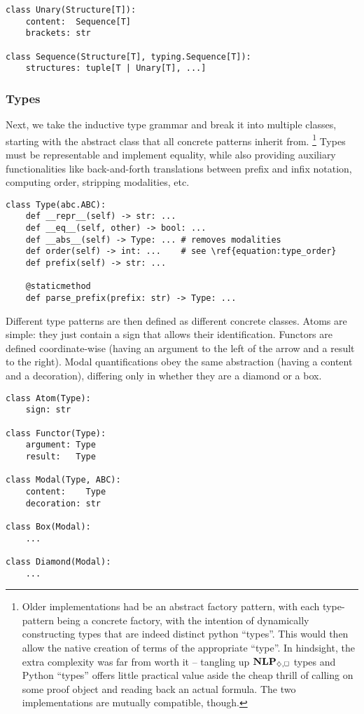 \begin{verbatim}
class Unary(Structure[T]):
	content:  Sequence[T]
	brackets: str

class Sequence(Structure[T], typing.Sequence[T]):
	structures: tuple[T | Unary[T], ...]
\end{verbatim}

\subsubsection{Types}
Next, we take the inductive type grammar and break it into multiple classes, starting with the abstract class that all concrete patterns inherit from.%
	\footnote{Older implementations had  be an abstract factory pattern, with each type-pattern being a concrete factory, with the intention of dynamically constructing types that are indeed distinct python ``types''.
	This would then allow the native creation of terms of the appropriate ``type''. 
	In hindsight, the extra complexity was far from worth it -- tangling up $\NLPplus{}$ types and Python ``types'' offers little practical value aside the cheap thrill of calling  on some proof object and reading back an actual formula.
	The two implementations are mutually compatible, though.}
Types must be representable and implement equality, while also providing auxiliary functionalities like back-and-forth translations between prefix and infix notation, computing order, stripping modalities, etc.

\begin{verbatim}
class Type(abc.ABC): 
	def __repr__(self) -> str: ...
	def __eq__(self, other) -> bool: ...
	def __abs__(self) -> Type: ... # removes modalities
	def order(self) -> int: ...    # see \ref{equation:type_order}
	def prefix(self) -> str: ...  
	
	@staticmethod
	def parse_prefix(prefix: str) -> Type: ...  
\end{verbatim}

\noindent Different type patterns are then defined as different concrete classes.
Atoms are simple: they just contain a sign that allows their identification.
Functors are defined coordinate-wise (having an argument to the left of the arrow and a result to the right).
Modal quantifications obey the same abstraction (having a content and a decoration), differing only in whether they are a diamond or a box.

\begin{verbatim}
class Atom(Type):
	sign: str

class Functor(Type):
	argument: Type
	result:   Type
	
class Modal(Type, ABC):
	content:    Type
	decoration: str
	
class Box(Modal):
	...
	
class Diamond(Modal):
	...
\end{verbatim}

